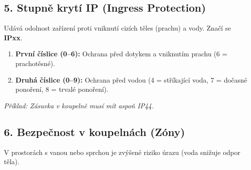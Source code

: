 \documentclass[a4paper,10pt]{article}
\begin{document}
\begin{vysvetlenibox}
\begin{center}
\end{center}

\subsection*{5. Stupně krytí IP (Ingress Protection)}

Udává odolnost zařízení proti vniknutí cizích těles (prachu) a vody. Značí se \textbf{IPxx}.
\begin{enumerate}
    \item \textbf{První číslice (0–6):} Ochrana před dotykem a vniknutím prachu (6 = prachotěsné).
    \item \textbf{Druhá číslice (0–9):} Ochrana před vodou (4 = stříkající voda, 7 = dočasné ponoření, 8 = trvalé ponoření).
\end{enumerate}
\textit{Příklad: Zásuvka v koupelně musí mít aspoň IP44.}

\subsection*{6. Bezpečnost v koupelnách (Zóny)}

V prostorách s vanou nebo sprchou je zvýšené riziko úrazu (voda snižuje odpor těla).

\begin{center}
\end{center}
\end{vysvetlenibox}
\end{document}
